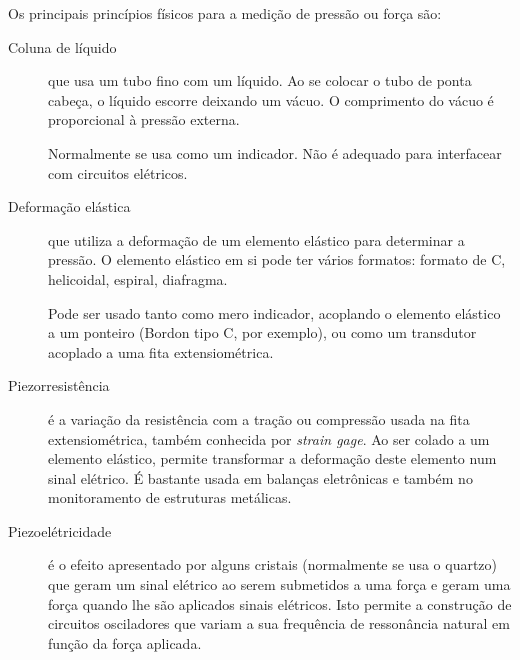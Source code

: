 Os principais princípios físicos para a medição de pressão ou força são:
\begin{description}
  \item[Coluna de líquido] que usa um tubo fino com um líquido. Ao se colocar o tubo de ponta cabeça, o líquido escorre deixando um vácuo. O comprimento do vácuo é proporcional à pressão externa.

  Normalmente se usa como um indicador. Não é adequado para interfacear com circuitos elétricos.

  \item[Deformação elástica] que utiliza a deformação de um elemento elástico para determinar a pressão. O elemento elástico em si pode ter vários formatos: formato de C, helicoidal, espiral, diafragma.

  Pode ser usado tanto como mero indicador, acoplando o elemento elástico a um ponteiro (Bordon tipo C, por exemplo), ou como um transdutor acoplado a uma fita extensiométrica.

  \item[Piezorresistência] é a variação da resistência com a tração ou compressão usada na fita extensiométrica, também conhecida por \emph{strain gage}. Ao ser colado a um elemento elástico, permite transformar a deformação deste elemento num sinal elétrico. É bastante usada em balanças eletrônicas e também no monitoramento de estruturas metálicas.

  \item[Piezoelétricidade] é o efeito apresentado por alguns cristais (normalmente se usa o quartzo) que geram um sinal elétrico ao serem submetidos a uma força e geram uma força quando lhe são aplicados sinais elétricos. Isto permite a construção de circuitos osciladores que variam a sua frequência de ressonância natural em função da força aplicada.
\end{description}

